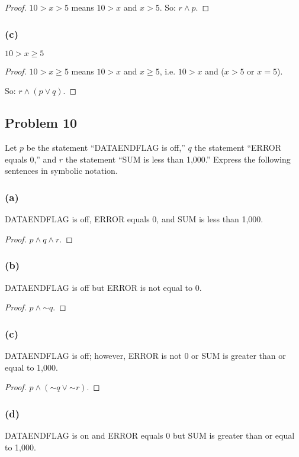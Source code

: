 \documentclass[14pt]{extarticle}
\begin{document}
\begin{proof}
$10 > x > 5$ means $10 > x$ and $x > 5$. So: $r \wedge p$.
\end{proof}

\subsubsection{(c)}
$10 > x \geq 5$

\begin{proof}
$10 > x \geq 5$ means $10 > x$ and $x \geq 5$, i.e. $10 > x$ and
($x > 5$ or $x = 5$).

So: $r \wedge (p \vee q)$.
\end{proof}

\subsection{Problem 10}
Let $p$ be the statement “DATAENDFLAG is off,” $q$ the statement “ERROR equals 0,” and $r$ the statement “SUM is less than 1,000.” Express the following sentences in symbolic notation.

\subsubsection{(a)}
DATAENDFLAG is off, ERROR equals 0, and SUM is less than 1,000.

\begin{proof}
$p \wedge q \wedge r$.
\end{proof}

\subsubsection{(b)}
DATAENDFLAG is off but ERROR is not equal to 0.

\begin{proof}
$p \wedge {\sim q}$.
\end{proof}

\subsubsection{(c)}
DATAENDFLAG is off; however, ERROR is not 0 or SUM is greater than or equal to 1,000.

\begin{proof}
$p \wedge ({\sim q} \vee {\sim r})$.
\end{proof}

\subsubsection{(d)}
DATAENDFLAG is on and ERROR equals 0 but SUM is greater than or equal to 1,000.
\end{document}
